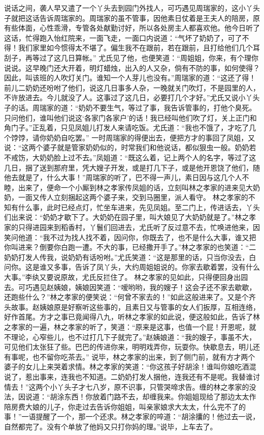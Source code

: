 \documentclass[12pt,oneside]{book}
\begin{document}
说话之间，袭人早又遣了一个丫头去到园门外找人，可巧遇见周瑞家的，这小丫头子就把这话告诉周瑞家的。周瑞家的虽不管事，因他素日仗着是王夫人的陪房，原有些体面，心性乖滑，专管各处献勤讨好，所以各处房主人都喜欢他。他今日听了这话，忙得跑入怡红院来，一面飞走，一面口内说道：“气坏了奶奶了，可了不得！我们家里如今惯得太不堪了。偏生我不在跟前，若在跟前，且打给他们几个耳刮子，再等过了这几日算帐。”
尤氏见了他，也便笑道：“周姐姐，你来，有个理你说说。这早晚门还大开着，明灯蜡烛，出入的人又杂，倘有不防的事，如何使得？因此，叫该班的人吹灯关门。谁知一个人芽儿也没有。”周瑞家的道：“这还了得！前儿二奶奶还吩咐了他们，说这几日事多人杂，一晚就关门吹灯，不是园里的人，不许放进去。今儿就没了人。这事过了这几日，必要打几个才好。”尤氏又说小丫头子的话。周瑞家的道：“奶奶不要生气，等过了事，我告诉管事的，打他个臭死。只问他们，谁叫他们说这‘各家门各家户’的话！我已经叫他们吹了灯，关上正门和角门子。”正乱着，只见凤姐儿打发人来请吃饭。尤氏道：“我也不饿了，才吃了几个饽饽，请你奶奶自吃罢。”
一时周瑞家的得便出去，便把方才的事回了凤姐，又说：“这两个婆子就是管家奶奶似的，时常我们和他说话，都似狠虫一般。奶奶若不戒饬，大奶奶脸上过不去。”凤姐道：“既这么着，记上两个人的名字，等过了这几日，捆了送到那府里，凭大嫂子开发，或是打几下子，或是他开恩饶了他们，随他去就是了，什么大事！”周瑞家的听了，巴不得一声儿，素日因与这几个人不睦，出来了，便命一个小厮到林之孝家传凤姐的话，立刻叫林之孝家的进来见大奶奶，一面又传人立刻捆起这两个婆子来，交到马圈里，派人看守。
林之孝家的不知有什么事，此时已经点灯，忙坐车进来，先见凤姐。至二门上，传进话去，丫头们出来说：“奶奶才歇下了。大奶奶在园子里，叫大娘见了大奶奶就是了。”林之孝家的只得进园来到稻香村，丫鬟们回进去，尤氏听了反过意不去，忙唤进他来，因笑问他道：“我不过为找人找不着，因问你，你既去了，也不是什么大事，谁又把你叫进来？倒要你白跑一遭。不大的事，已经撒开手了。”林之孝家的也笑道：“二奶奶打发人传我，说奶奶有话吩咐。”尤氏笑道：“这是那里的话，只当你没去，白问你。这是谁又多事，告诉了凤丫头，大约周姐姐说的。你家去歇着罢，没有什么大事。”李纨又要说原故，尤氏反拦住了。
林之孝家的见如此，只得便回身出园去。可巧遇见赵姨娘，姨娘因笑道：“嗳哟哟，我的嫂子！这会子还不家去歇歇，还跑些什么？”林之孝家的便笑说：“何曾不家去的！”如此这般进来了。又是个齐头故事。赵姨娘原是好察听这些事的，且素日又与管事的女人们扳厚，互相连络，好作首尾。方才之事已竟闻得八九，听林之孝家的如此说，便这般如此，告诉了林之孝家的一遍，林之孝家的听了，笑道：“原来是这事，也值一个屁！开恩呢，就不理论，心窄些儿，也不过打几下子就完了。”赵姨娘道：“我的嫂子，事虽不大，可见他们太张狂了些。巴巴的传进你来，明明戏弄你，玩耍你。快歇息去，明儿还有事呢，也不留你吃茶去。”
说毕，林之孝家的出来，到了侧门前，就有方才两个婆子的女儿上来哭着求情。林之孝家的笑道：“你这孩子好胡涂！谁叫你娘吃酒混说了，惹出事来，连我也不知道。二奶奶打发人捆他，连我还有不是呢。我替谁讨情去！”这两个小丫头子才七八岁，原不识事，只管哭啼求告。缠的林之孝家的没法，因说道：“胡涂东西！你放着门路不去，却缠我来。你姐姐现给了那边太太作陪房费大娘的儿子，你走过去告诉你姐姐，叫亲家娘求大太太，什么完不了的事！”一语提醒了一个，那一个还求。林之孝家的啐道：“胡涂攮的！他过去一说，自然都完了。没有个单放了他妈又只打你妈的理。”说毕，上车去了。
\end{document}
